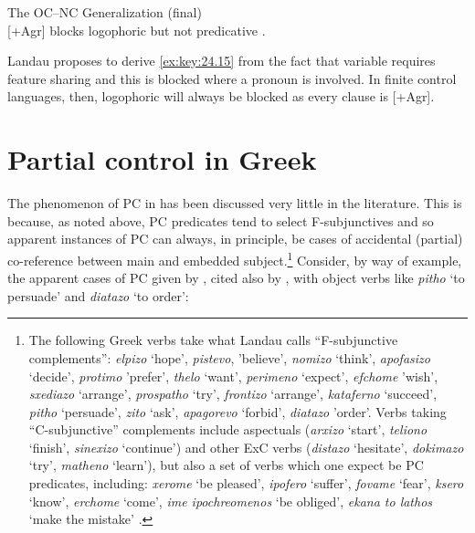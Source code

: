\documentclass[output=paper]{langsci/langscibook}
\begin{document}
\ea\label{ex:key:24.15} The \gls{OC}--NC Generalization (final)\\
    {}[+Agr] blocks logophoric  but not predicative .
\z

Landau proposes to derive \eqref{ex:key:24.15} from the fact that variable  requires
feature sharing and this is blocked where a pronoun is involved. In finite
control languages, then, logophoric  will always be blocked as every
clause is [+Agr].

\section{Partial control in Greek}\label{sec:key:24.3}

The phenomenon of \gls{PC} in  has been
discussed very little in the literature. This is because, as noted above,
\gls{PC} predicates tend to select F-subjunctives
and so apparent instances of \gls{PC} can always, in
principle, be cases of accidental (partial) co-reference between main and
embedded subject.\footnote{The following Greek verbs take what Landau calls
    \enquote{F-subjunctive complements}: \emph{elpizo} `hope',
    \emph{pistevo}, 'believe', \emph{nomizo} `think', \emph{apofasizo}
    `decide', \emph{protimo} 'prefer', \emph{thelo} `want', \emph{perimeno}
    `expect', \emph{efchome} 'wish', \emph{sxediazo} `arrange',
    \emph{prospatho} `try', \emph{frontizo} `arrange', \emph{kataferno}
    `succeed', \emph{pitho} `persuade', \emph{zito} `ask', \emph{apagorevo}
    `forbid', \emph{diatazo} 'order'. Verbs taking \enquote{C-subjunctive}
    complements include aspectuals (\emph{arxizo} `start', \emph{teliono}
    `finish', \emph{sinexizo} `continue') and other
    \gls{ExC} verbs (\emph{distazo} `hesitate',
    \emph{dokimazo} `try', \emph{matheno} `learn'), but also a set of verbs
    which one expect be \gls{PC} predicates,
    including: \emph{xerome} `be pleased', \emph{ipofero} `suffer',
    \emph{fovame} `fear', \emph{ksero} `know', \emph{erchome} `come', \emph{ime
ipochreomenos} `be obliged', \emph{ekana to lathos} `make the mistake'
\parencite[Ch.\ 4]{Varlokosta1994}.\label{fn:24.4}} Consider, by way of
example, the apparent cases of \gls{PC} given by
\textcite{Spyropoulos2007b}, cited also by \textcite{Kapetangianni2010}, with
object  verbs like \emph{pitho} `to persuade' and \emph{diatazo} `to
order':
\end{document}
